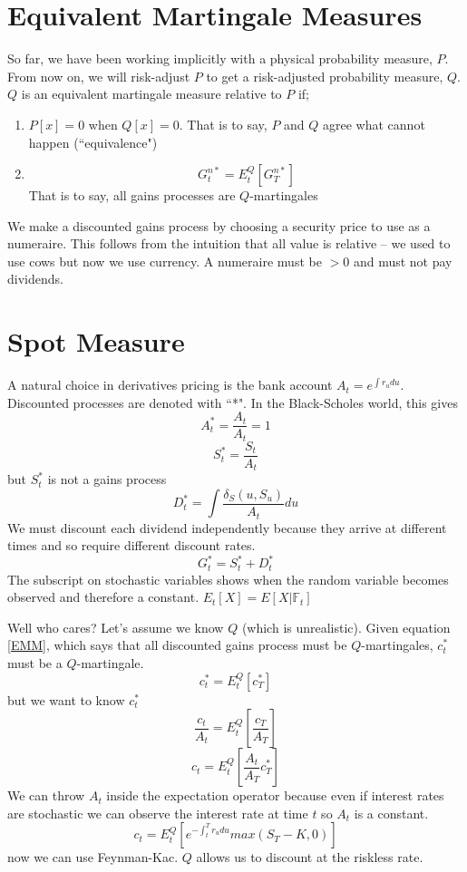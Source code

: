
\section{Equivalent Martingale Measures}

So far, we have been working implicitly with a physical probability measure,
$P$.
From now on, we will risk-adjust $P$ to get a risk-adjusted probability
measure, $Q$.
$Q$ is an equivalent martingale measure relative to $P$ if;
\begin{enumerate}
    \item $P[x]=0$ when $Q[x]=0$. That is to say, $P$ and $Q$ agree what cannot
          happen (``equivalence")
  \item \begin{equation} \label{EMM}
            G_t^{n*}=E_t^Q[G_T^{n*}]
        \end{equation}
        That is to say, all gains processes are $Q$-martingales
\end{enumerate}
We make a discounted gains process by choosing a security price to use as
a numeraire. This follows from the intuition that all value is relative -- we
used to use cows but now we use currency. A numeraire must be $> 0$ and must
not pay dividends.

\section{Spot Measure}

A natural choice in derivatives pricing is the bank account
$A_t=e^{\int r_udu}$. Discounted processes are denoted with ``*".
In the Black-Scholes world, this gives
\[A_t^*=\frac{A_t}{A_t}=1\]
\[S_t^*=\frac{S_t}{A_t}\]
but $S_t^*$ is not a gains process
\[D_t^*=\int\frac{\delta_S(u,S_u)}{A_t}du\]
We must discount each dividend independently because they arrive at different
times and so require different discount rates.
\[G_t^*=S_t^*+D_t^*\]
The subscript on stochastic variables shows when the random variable becomes
observed and therefore a constant. $E_t[X]=E[X|\mathbb{F}_t]$

Well who cares? Let's assume we know $Q$ (which is unrealistic).
Given equation \ref{EMM}, which says that all discounted gains process must be
$Q$-martingales, $c_t^*$ must be a $Q$-martingale.
\[c_t^*=E_t^Q[c_T^*]\]
but we want to know $c_t^*$
\[\frac{c_t}{A_t}=E_t^Q\left[ \frac{c_T}{A_T} \right]\]
\[c_t=E_t^Q\left[ \frac{A_t}{A_T}c_T^* \right]\]
We can throw $A_t$ inside the expectation operator because even if interest
rates are stochastic we can observe the interest rate at time $t$ so $A_t$ is
a constant.
\[c_t=E_t^Q\left[ e^{-\int_t^Tr_udu}max(S_T-K,0) \right]\]
now we can use Feynman-Kac. $Q$ allows us to discount at the riskless rate.

